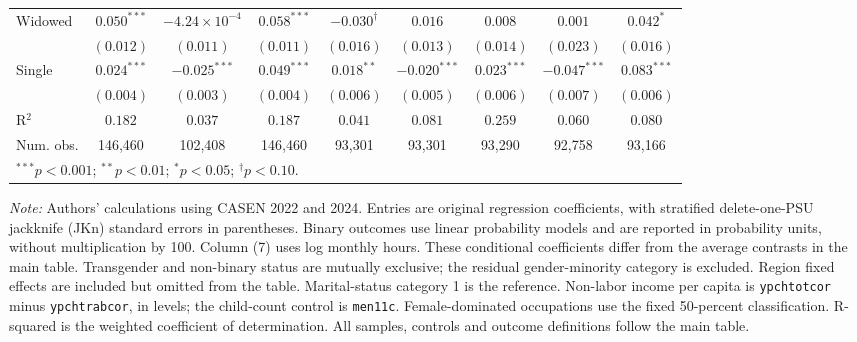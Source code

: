 \begin{table}[htpb]
\begin{adjustbox}{max totalsize={\textwidth}{0.76\textheight},center}
\begin{tabular}{l c c c c c c c c}
Widowed & ${0.050}^{***}$ & ${-4.24\times 10^{-4}}$ & ${0.058}^{***}$ & ${-0.030}^{\dagger}$ & ${0.016}$ & ${0.008}$ & ${0.001}$ & ${0.042}^{*}$ \\
 & $(0.012)$ & $(0.011)$ & $(0.011)$ & $(0.016)$ & $(0.013)$ & $(0.014)$ & $(0.023)$ & $(0.016)$ \\
Single & ${0.024}^{***}$ & ${-0.025}^{***}$ & ${0.049}^{***}$ & ${0.018}^{**}$ & ${-0.020}^{***}$ & ${0.023}^{***}$ & ${-0.047}^{***}$ & ${0.083}^{***}$ \\
 & $(0.004)$ & $(0.003)$ & $(0.004)$ & $(0.006)$ & $(0.005)$ & $(0.006)$ & $(0.007)$ & $(0.006)$ \\
\hline
R$^2$ & $0.182$ & $0.037$ & $0.187$ & $0.041$ & $0.081$ & $0.259$ & $0.060$ & $0.080$ \\
Num. obs. & 146,460 & 102,408 & 146,460 & 93,301 & 93,301 & 93,290 & 92,758 & 93,166 \\
\hline
\multicolumn{9}{l}{\scriptsize $^{***}p<0.001$; $^{**}p<0.01$; $^{*}p<0.05$; $^{\dagger}p<0.10$.} \\
\end{tabular}
\end{adjustbox}
\endgroup
\par\smallskip
\begin{minipage}{\textwidth}\footnotesize\raggedright
\textit{Note:} Authors' calculations using CASEN 2022 and 2024. Entries are original regression coefficients, with stratified delete-one-PSU jackknife (JKn) standard errors in parentheses. Binary outcomes use linear probability models and are reported in probability units, without multiplication by 100. Column (7) uses log monthly hours. These conditional coefficients differ from the average contrasts in the main table. Transgender and non-binary status are mutually exclusive; the residual gender-minority category is excluded. Region fixed effects are included but omitted from the table. Marital-status category 1 is the reference. Non-labor income per capita is \texttt{ypchtotcor} minus \texttt{ypchtrabcor}, in levels; the child-count control is \texttt{men11c}. Female-dominated occupations use the fixed 50-percent classification. R-squared is the weighted coefficient of determination. All samples, controls and outcome definitions follow the main table.
\end{minipage}
\end{table}
